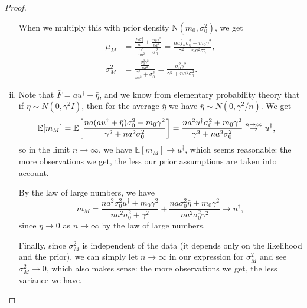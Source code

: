 \documentclass{article}
\theoremstyle{plain}
\theoremstyle{remark}
\newcommand{\Bb}{\mathbb}
\newcommand{\Rm}{\mathrm}
\newcommand{\EE}{\Bb E}
\newcommand{\D}{^\dagger}
\begin{document}
\begin{proof}
\begin{enumerate}[(i)]
When we multiply this with prior density $\Rm N(m_0, \sigma_0^2)$, we get
\begin{align*}
	\mu_M &= \frac{\frac{\bar f_n \sigma_0^2}{a} + \frac{m_0\gamma^2}{na^2}}{\frac{\gamma^2}{na^2} + \sigma_0^2} = \frac{n a \bar f_n\sigma_0^2 + m_0\gamma^2}{\gamma^2 + na^2\sigma_0^2}, \\
	\sigma_M^2 &= \frac{\frac{\sigma_0^2\gamma^2}{na^2}}{\frac{\gamma^2}{na^2} + \sigma_0^2} = \frac{\sigma_0^2\gamma^2}{\gamma^2 + na^2\sigma_0^2}. 
\end{align*}

\item Note that $\bar F = a u\D + \bar\eta$, and we know from elementary probability theory that if $\eta \sim N(0, \gamma^2I)$, then for the average $\bar\eta$ we have $\bar \eta \sim N(0, \gamma^2/n)$. 
We get
\begin{align*}
	\EE[m_M]  &= \EE\qty[ \frac{n a (au\D + \bar\eta) \sigma_0^2 + m_0\gamma^2}{\gamma^2 + na^2\sigma_0^2}] = \frac{na^2 u\D \sigma_0^2 + m_0\gamma^2}{\gamma^2 + na^2\sigma_0^2} \overset{n\to\infty}\to  u\D,
\end{align*}
so in the limit $n \to\infty$, we have $\EE[m_M] \to u\D$, which seems reasonable: the more observations we get, the less our prior assumptions are taken into account. 

By the law of large numbers, we have
\[
m_M = \frac{na^2\sigma_0^2 u\D + m_0\gamma^2}{n a^2 \sigma_0^2 + \gamma^2} + \frac{na\sigma_0^2 \bar\eta + m_0\gamma^2}{na^2\sigma_0^2\gamma^2} \to u\D, 
\]
since $\bar\eta \to 0$ as $n\to\infty$ by the law of large numbers. 

Finally, since $\sigma_M^2$ is independent of the data (it depends only on the likelihood and the prior), we can simply let $n\to\infty$ in our expression for $\sigma_M^2$ and see $\sigma_M^2 \to 0$, which also makes sense: the more observations we get, the less variance we have. 
	\end{enumerate}
\end{proof}
\end{document}
